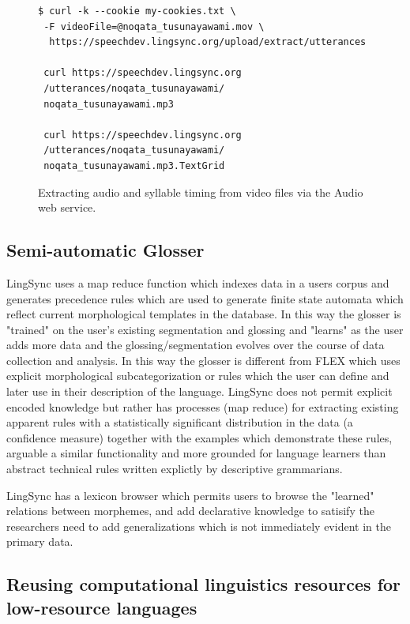\documentclass[11pt]{article}
\begin{document}
\begin{figure}[h]
\scriptsize
\begin{verbatim}
$ curl -k --cookie my-cookies.txt \
 -F videoFile=@noqata_tusunayawami.mov \
  https://speechdev.lingsync.org/upload/extract/utterances
  
 curl https://speechdev.lingsync.org
 /utterances/noqata_tusunayawami/
 noqata_tusunayawami.mp3 
 
 curl https://speechdev.lingsync.org
 /utterances/noqata_tusunayawami/
 noqata_tusunayawami.mp3.TextGrid
\end{verbatim}
\normalsize
\caption{Extracting audio and syllable timing from video files via the Audio web service.}
\label{lingsync-video}
\end{figure}

\subsection{Semi-automatic Glosser}

LingSync uses a map reduce function which indexes data in a users corpus and generates precedence rules which are used to generate finite state automata  which reflect current morphological templates in the database. In this way the glosser is "trained" on the user's existing segmentation and glossing and "learns" as the user adds more data and the glossing/segmentation evolves over the course of data collection and analysis. In this way the glosser is different from FLEX which uses explicit morphological subcategorization or rules which the user can define and later use in their description of the language. LingSync does not permit explicit encoded knowledge but rather has processes (map reduce) for extracting existing apparent rules with a statistically significant distribution in the data (a confidence measure) together with the examples which demonstrate these rules, arguable a similar functionality and more grounded for language learners than abstract technical rules written explictly by descriptive grammarians.  

LingSync has a lexicon browser which permits users to browse the "learned"  relations between morphemes, and add declarative knowledge to satisify the researchers need to add generalizations which is not immediately evident in the primary data.

\subsection{Reusing computational linguistics resources for low-resource languages}
\end{document}
